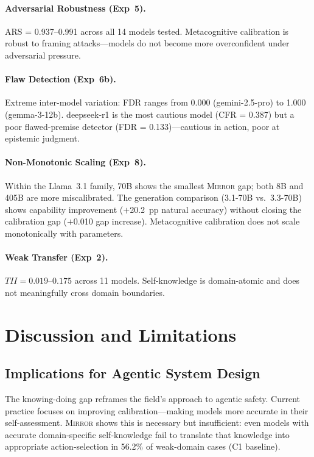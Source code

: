 \documentclass[10pt]{article}
\newcommand{\mirror}{\textsc{Mirror}}
\newcommand{\ARS}{ARS}
\newcommand{\CFR}{CFR}
\newcommand{\FDR}{FDR}
\newcommand{\TII}{TII}
\begin{document}
\paragraph{Adversarial Robustness (Exp~5).}
\ARS{} = 0.937--0.991 across all 14 models tested. Metacognitive calibration is
robust to framing attacks---models do not become more overconfident under
adversarial pressure.

\paragraph{Flaw Detection (Exp~6b).}
Extreme inter-model variation: \FDR{} ranges from 0.000 (gemini-2.5-pro) to 1.000 (gemma-3-12b). deepseek-r1 is the most cautious model (\CFR{} = 0.387) but a poor flawed-premise detector (\FDR{} = 0.133)---cautious in action, poor at epistemic judgment.

\paragraph{Non-Monotonic Scaling (Exp~8).}
Within the Llama~3.1 family, 70B shows the smallest \mirror{} gap; both 8B and
405B are more miscalibrated. The generation comparison (3.1-70B vs.\ 3.3-70B)
shows capability improvement ($+$20.2~pp natural accuracy) without closing the
calibration gap ($+$0.010 gap increase). Metacognitive calibration does not scale
monotonically with parameters.

\paragraph{Weak Transfer (Exp~2).}
$\TII{} = 0.019$--$0.175$ across 11 models. Self-knowledge is domain-atomic and does not meaningfully cross domain boundaries.

\section{Discussion and Limitations}
\label{sec:discussion}

\subsection{Implications for Agentic System Design}

The knowing-doing gap reframes the field's approach to agentic safety. Current
practice focuses on improving calibration---making models more accurate in their
self-assessment. \mirror{} shows this is necessary but insufficient: even models
with accurate domain-specific self-knowledge fail to translate that knowledge into
appropriate action-selection in 56.2\% of weak-domain cases (C1 baseline).
\end{document}
